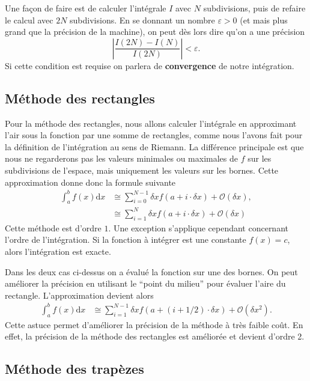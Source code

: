 \documentclass[a4paper,12pt]{book}
\newcommand{\dd}{\mathrm{d}}
\begin{document}
Une façon de faire est de calculer l'intégrale $I$ avec $N$ subdivisions, puis
de refaire le calcul avec $2N$ subdivisions. En se donnant un nombre $\varepsilon>0$ (et mais plus grand que la précision de la machine), 
on peut dès lors dire qu'on a une précision 
\begin{equation}
 \left|\frac{I(2N)-I(N)}{I(2N)}\right|<\varepsilon.
\end{equation}
Si cette condition est requise on parlera de \textbf{convergence} de notre intégration.


\subsection{Méthode des rectangles}
Pour la méthode des rectangles, nous allons calculer l'intégrale en approximant l'air sous la fonction par une somme de rectangles,
comme nous l'avons fait pour la définition de l'intégration au sens de Riemann.
La différence principale est que nous ne regarderons pas les valeurs minimales ou maximales de $f$ sur les 
subdivisions de l'espace, mais uniquement les valeurs sur les bornes. Cette approximation donne donc la formule suivante
\begin{align}
 \int_a^bf(x)\dd x&\cong\sum_{i=0}^{N-1} \delta x f(a+i\cdot\delta x)+\mathcal{O}(\delta x),\\
 &\cong\sum_{i=1}^{N} \delta x f(a+i\cdot\delta x)+\mathcal{O}(\delta x)\label{eq_rect_gauche}
\end{align}
Cette méthode est d'ordre $1$. Une exception s'applique cependant concernant l'ordre de l'intégration.
Si la fonction à intégrer est une constante $f(x)=c$, alors l'intégration est exacte.

Dans les deux cas ci-dessus on a évalué la fonction sur une des bornes. On peut améliorer la précision
en utilisant le ``point du milieu'' pour évaluer l'aire du rectangle. L'approximation devient alors
\begin{align}
 \int_a^bf(x)\dd x&\cong\sum_{i=1}^{N-1} \delta x f(a+(i+1/2)\cdot\delta x)+\mathcal{O}(\delta x^2).
\end{align}
Cette astuce permet d'améliorer la précision de la méthode à très faible coût.
En effet, la précision de la méthode des rectangles est améliorée et devient d'ordre 2.

\subsection{Méthode des trapèzes}
\end{document}
